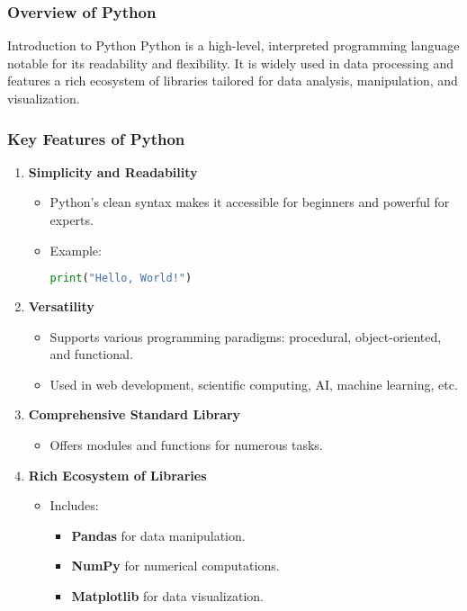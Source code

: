 \documentclass[aspectratio=169]{beamer}
\begin{document}
\begin{frame}[fragile]
    \frametitle{Overview of Python}
    \begin{block}{Introduction to Python}
        Python is a high-level, interpreted programming language notable for its readability and flexibility. 
        It is widely used in data processing and features a rich ecosystem of libraries tailored for data analysis, manipulation, and visualization.
    \end{block}
\end{frame}

\begin{frame}[fragile]
    \frametitle{Key Features of Python}

    \begin{enumerate}
        \item \textbf{Simplicity and Readability}
        \begin{itemize}
            \item Python's clean syntax makes it accessible for beginners and powerful for experts.
            \item Example:
                \begin{lstlisting}[language=Python]
print("Hello, World!")
                \end{lstlisting}
        \end{itemize}

        \item \textbf{Versatility}
        \begin{itemize}
            \item Supports various programming paradigms: procedural, object-oriented, and functional.
            \item Used in web development, scientific computing, AI, machine learning, etc.
        \end{itemize}

        \item \textbf{Comprehensive Standard Library}
        \begin{itemize}
            \item Offers modules and functions for numerous tasks.
        \end{itemize}

        \item \textbf{Rich Ecosystem of Libraries}
        \begin{itemize}
            \item Includes:
                \begin{itemize}
                    \item \textbf{Pandas} for data manipulation.
                    \item \textbf{NumPy} for numerical computations.
                    \item \textbf{Matplotlib} for data visualization.
                \end{itemize}
        \end{itemize}
    \end{enumerate}
\end{frame}
\end{document}
